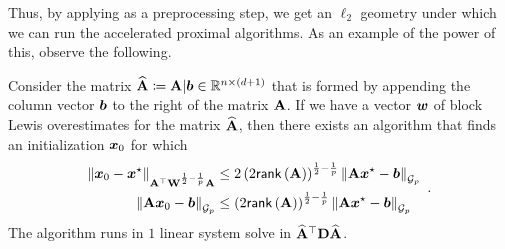 Thus, by applying  as a preprocessing step, we get an $\ell_2$ geometry under which we can run the accelerated proximal algorithms. As an example of the power of this, observe the following.

\begin{lemma}
\label{lemma:gp_regression_initialization}
Consider the matrix $\widehat{\mathbf{A}} \coloneqq \mathbf{A} \vert \bm{b} \in \mathbb{R}^{n \times (d+1)}$ that is formed by appending the column vector $\bm{b}$ to the right of the matrix $\mathbf{A}$. If we have a vector $\bm{w}$ of block Lewis overestimates for the matrix $\widehat{\mathbf{A}}$, then there exists an algorithm that finds an initialization $\bm{x}_0$ for which
\begin{equation*}
    \begin{aligned}
        \left\lVert \bm{x}_0-\bm{x}^{\star} \right\rVert_{\mathbf{A}^{\top}\mathbf{W}^{\frac{1}{2}-\frac{1}{p}}\mathbf{A}} &\le 2\left(2\mathsf{rank}\left(\mathbf{A}\right)\right)^{\frac{1}{2}-\frac{1}{p}}\left\lVert \mathbf{A}\bm{x}^{\star}-\bm{b} \right\rVert_{\mathcal{G}_{p}} \\
        \left\lVert \mathbf{A}\bm{x}_0-\bm{b} \right\rVert_{\mathcal{G}_{p}} &\le \left(2\mathsf{rank}\left(\mathbf{A}\right)\right)^{\frac{1}{2}-\frac{1}{p}}\left\lVert \mathbf{A}\bm{x}^{\star}-\bm{b} \right\rVert_{\mathcal{G}_{p}}
    \end{aligned}\enspace .
\end{equation*}
The algorithm runs in $1$ linear system solve in $\widehat{\mathbf{A}}^{\top}\mathbf{D}\widehat{\mathbf{A}}$.
\end{lemma}

